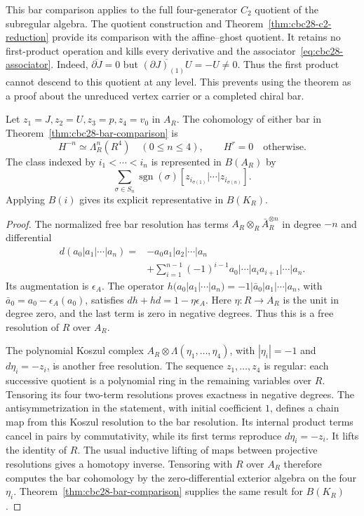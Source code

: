 This bar comparison applies to the full four-generator $C_2$ quotient of the subregular algebra.
The quotient construction and Theorem~\ref{thm:cbc28-c2-reduction} provide its comparison with the affine--ghost quotient.
It retains no first-product operation and kills every derivative and the associator~\eqref{eq:cbc28-associator}.
Indeed, $\overline{\partial J}=0$ but
$\overline{(\partial J)_{(1)}U}=-U\ne0$.
Thus the first product cannot descend to this quotient at any level.
This prevents using the theorem as a proof about the unreduced vertex carrier or a completed chiral bar.

\begin{corollary}\label{cor:cbc28-bar-cohomology}
Let $z_1=J,z_2=U,z_3=p,z_4=v_0$ in $A_R$.
The cohomology of either bar in Theorem~\ref{thm:cbc28-bar-comparison} is
\[
 H^{-n}\simeq\Lambda_R^n(R^4)\quad(0\leq n\leq4),
 \qquad H^r=0\quad\text{otherwise}.
\]
The class indexed by $i_1<\cdots<i_n$ is represented in $B(A_R)$ by
\[
 \sum_{\sigma\in S_n}\operatorname{sgn}(\sigma)
 [z_{i_{\sigma(1)}}|\cdots|z_{i_{\sigma(n)}}].
\]
Applying $B(i)$ gives its explicit representative in $B(K_R)$.
\end{corollary}
\begin{proof}
The normalized free bar resolution has terms
$A_R\otimes_R\bar A_R^{\otimes n}$ in degree $-n$ and differential
\[
 \begin{split}
 d(a_0|a_1|\cdots|a_n)
 ={}&-a_0a_1|a_2|\cdots|a_n\\
 &+\sum_{i=1}^{n-1}(-1)^{i-1}
 a_0|\cdots|a_ia_{i+1}|\cdots|a_n.
 \end{split}
\]
Its augmentation is $\epsilon_A$.
The operator $h(a_0|a_1|\cdots|a_n)=-1|\bar a_0|a_1|\cdots|a_n$, with
$\bar a_0=a_0-\epsilon_A(a_0)$, satisfies $dh+hd=1-\eta\epsilon_A$.
Here $\eta:R\to A_R$ is the unit in degree zero, and the last term is zero in negative degrees.
Thus this is a free resolution of $R$ over $A_R$.

The polynomial Koszul complex $A_R\otimes\Lambda(\eta_1,\ldots,\eta_4)$, with
$|\eta_i|=-1$ and $d\eta_i=-z_i$, is another free resolution.
The sequence $z_1,\ldots,z_4$ is regular: each successive quotient is a polynomial ring in the remaining variables over $R$.
Tensoring its four two-term resolutions proves exactness in negative degrees.
The antisymmetrization in the statement, with initial coefficient $1$, defines a chain map from this Koszul resolution to the bar resolution.
Its internal product terms cancel in pairs by commutativity, while its first terms reproduce $d\eta_i=-z_i$.
It lifts the identity of $R$.
The usual inductive lifting of maps between projective resolutions gives a homotopy inverse.
Tensoring with $R$ over $A_R$ therefore computes the bar cohomology by the zero-differential exterior algebra on the four $\eta_i$.
Theorem~\ref{thm:cbc28-bar-comparison} supplies the same result for $B(K_R)$.
\end{proof}

